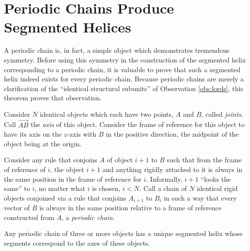 \documentclass{svproc}
\begin{document}
\section{Periodic Chains Produce Segmented Helices}

A periodic chain is, in fact, a simple object which demonstrates tremendous symmetry.
Before using this symmetry in the construction of the segmented helix corresponding to a periodic chain,
it is valuable to
prove that such a segmented helix indeed exists for every periodic chain.
Because periodic chains are merely a clarification of the ``identical structural subunits''
of Observation \ref{obs:lords},
this theorem proves that observation.

\begin{theorem}
  \label{thm:helix}
  Consider $N$ identical objects which each have two points, $A$ and $B$, called {\em joints}. Call
  $\overrightarrow{AB}$ the {\em axis} of this object.
  Consider the frame of reference for this object to have
  its axis on the $z$-axis with $B$ in the positive direction, the
  midpoint of the object being at the origin.

  Consider any rule that conjoins $A$ of object $i+1$ to $B$ such that
  from the frame of reference of $i$, the object $i+1$ and anything rigidly
  attached to it is always in the same position in the frame of reference for $i$.
  Informally, $i+1$ ``looks the same'' to $i$, no matter what $i$ is chosen, $i < N$.
  Call a chain of $N$ identical rigid objects conjoined via a rule that
  conjoins $A_{i+1}$ to $B_i$ in such a way that every vector
  of $B$ is always in the same position relative to a frame of reference
  constructed from $A$, a {\em periodic chain.}

  Any periodic chain of three or more objects has a unique segmented helix
  whose segments correspond
  to the axes of these objects.
\end{theorem}



\end{document}
